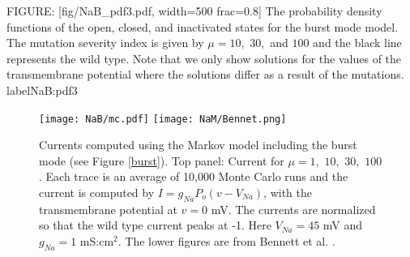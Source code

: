 FIGURE: [fig/NaB_pdf3.pdf, width=500 frac=0.8]  The probability density functions of the open, closed, and inactivated states for the
burst mode model. The mutation severity index is given by $\mu=10,$ $30,$ and $100$ and the black line represents the wild type.
Note that we only show solutions for the values of the transmembrane potential where the solutions differ as a result of the mutations. label{NaB:pdf3}%
\begin{figure}[p]\centering
\vbox{
\texttt{[image: NaB/mc.pdf]}
\texttt{[image: NaM/Bennet.png]}
}
\caption{Currents computed using the Markov model including the burst mode (see Figure \ref{burst}). Top panel: Current for $\mu=1,$ $10,$ $30,$ $100$. Each trace is an average of 10,000 Monte Carlo runs and the current is computed by  $I=g_{Na} P_o (v-V_{Na})$, with the transmembrane potential at $v=0$ mV. The currents are normalized so that the wild type current peaks at -1. Here $V_{Na} = 45$ mV and $g_{Na} = 1$ mS:$\mbox{cm}^2$.  The lower figures are from Bennett et al. \cite{Bennett1995}.\label{NaB/mc}}
\end{figure}


